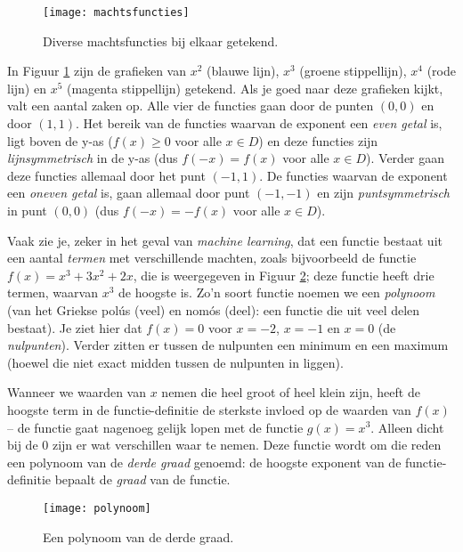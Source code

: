 \begin{figure}[h]
    \centering
    \texttt{[image: machtsfuncties]}
    \caption{Diverse machtsfuncties bij elkaar getekend.\label{img:machtsfuncties}}
\end{figure}

In Figuur \ref{img:machtsfuncties} zijn de grafieken van $x^2$ (blauwe lijn), $x^3$ (groene stippellijn), $x^4$ (rode lijn) en $x^5$ (magenta stippellijn) getekend. Als je goed naar deze grafieken kijkt, valt een aantal zaken op. Alle vier de functies gaan door de punten $(0,0)$ en door $(1,1)$. Het bereik van de functies waarvan de exponent een \textit{even getal} is, ligt boven de y-as ($f(x) \geq 0$ voor alle $x \in D$) en deze functies zijn \textit{lijnsymmetrisch} in de y-as (dus $f(-x) = f(x)$ voor alle $x \in D$). Verder gaan deze functies allemaal door het punt $(-1, 1)$. De functies waarvan de exponent een \textit{oneven getal} is, gaan allemaal door punt $(-1,-1)$ en zijn \textit{puntsymmetrisch} in punt $(0,0)$ (dus $f(-x)=-f(x)$ voor alle $x \in D$).

Vaak zie je, zeker in het geval van \textit{machine learning}, dat een functie bestaat uit een aantal \textit{termen} met verschillende machten, zoals bijvoorbeeld de functie $f(x) = x^3+3x^2+2x$, die is weergegeven in Figuur \ref{img:polynoom}; deze functie heeft drie termen, waarvan $x^3$ de hoogste is. Zo'n soort functie noemen we een \textit{polynoom} (van het Griekse polús (veel) en nomós (deel): een functie die uit veel delen bestaat). Je ziet hier dat $f(x)=0$ voor $x=-2$, $x=-1$ en $x=0$ (de \textit{nulpunten}). Verder zitten er tussen de nulpunten een minimum en een maximum (hoewel die niet exact midden tussen de nulpunten in liggen). 

Wanneer we waarden van $x$ nemen die heel groot of heel klein zijn, heeft de hoogste term in de functie-definitie de sterkste invloed op de waarden van $f(x)$ – de functie gaat nagenoeg gelijk lopen met de functie $g(x)=x^3$. Alleen dicht bij de 0 zijn er wat verschillen waar te nemen. Deze functie wordt om die reden een polynoom van de \textit{derde graad} genoemd: de hoogste exponent van de functie-definitie bepaalt de \textit{graad} van de functie. 

\begin{figure}[h]
    \centering
    \texttt{[image: polynoom]}
    \caption{Een polynoom van de derde graad.\label{img:polynoom}}
\end{figure}

